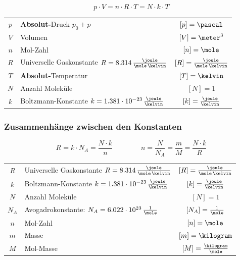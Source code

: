 \vspace{-0.2cm}

$$ \boxed{ p \cdot V = n \cdot R \cdot T = N \cdot k \cdot T }$$
	
\renewcommand{\arraystretch}{1.3}
\begin{tabular}{c l c}
	$p$	& \textbf{Absolut-}Druck $p_0 + p$ 											& $[p] = \pascal$							\\
	$V$	& Volumen 																	& $[V] = \meter^3$ 							\\
	$n$	& Mol-Zahl 																	& $[n] = \mole$	 							\\
	$R$	& Universelle Gaskonstante $R = 8.314 \, \frac{\joule}{\mole \, \kelvin}$ 	& $[R] = \frac{\joule}{\mole \, \kelvin}$ 	\\
	$T$	& \textbf{Absolut-}Temperatur 												& $[T] = \kelvin$ 							\\
	$N$	& Anzahl Moleküle 															& $[N] = 1$ 								\\
	$k$	& Boltzmann-Konstante $k = 1.381 \cdot 10^{-23} \, \frac{\joule}{\kelvin}$ 	& $[k] = \frac{\joule}{\kelvin}$
\end{tabular}
\renewcommand{\arraystretch}{1}
	
	
\subsubsection{Zusammenhänge zwischen den Konstanten}
	
\vspace{-0.2cm}

$$ \boxed{ R = k \cdot N_A = \frac{N \cdot k}{n} } \qquad \qquad \boxed{ n = \frac{N}{N_A} = \frac{m}{M} = \frac{N \cdot k}{R} }$$
	

\renewcommand{\arraystretch}{1.3}
\begin{tabular}{c l c}
	$R$		& Universelle Gaskonstante $R = 8.314 \, \frac{\joule}{\mole \, \kelvin}$ 	& $[R] = \frac{\joule}{\mole \, \kelvin}$ 	\\
	$k$		& Boltzmann-Konstante $k = 1.381 \cdot 10^{-23} \, \frac{\joule}{\kelvin}$ 	& $[k] = \frac{\joule}{\kelvin}$			\\
	$N$ 	& Anzahl Moleküle 															& $[N] = 1$ 								\\
	$N_A$ 	& Avogadrokonstante: $N_A = 6.022 \cdot 10^{23} \, \frac{1}{\mole}$ 		& $[N_A] = \frac{1}{\mole}$					\\	
	$n$ 	& Mol-Zahl 																	& $[n] = \mole$ 							\\
	$m$ 	& Masse 																	& $[m] = \kilogram$ 						\\
	$M$ 	& Mol-Masse 																& $[M] = \frac{\kilogram}{\mole}$
\end{tabular}
\renewcommand{\arraystretch}{1}



